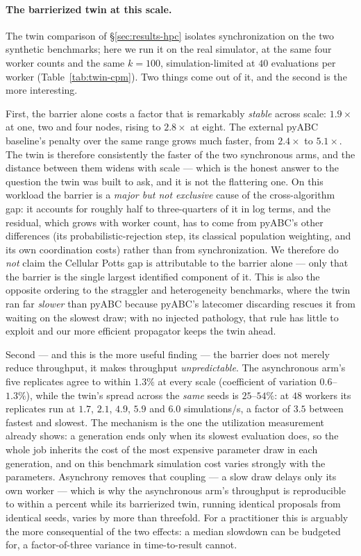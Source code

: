 \paragraph{The barrierized twin at this scale.} The twin comparison of \S\ref{sec:results-hpc} isolates synchronization on the two synthetic benchmarks; here we run it on the real simulator, at the same four worker counts and the same $k{=}100$, simulation-limited at $40$ evaluations per worker (Table~\ref{tab:twin-cpm}). Two things come out of it, and the second is the more interesting.

First, the barrier alone costs a factor that is remarkably \emph{stable} across scale: $1.9\times$ at one, two and four nodes, rising to $2.8\times$ at eight. The external pyABC baseline's penalty over the same range grows much faster, from $2.4\times$ to $5.1\times$. The twin is therefore consistently the faster of the two synchronous arms, and the distance between them widens with scale --- which is the honest answer to the question the twin was built to ask, and it is not the flattering one. On this workload the barrier is a \emph{major but not exclusive} cause of the cross-algorithm gap: it accounts for roughly half to three-quarters of it in log terms, and the residual, which grows with worker count, has to come from pyABC's other differences (its probabilistic-rejection step, its classical population weighting, and its own coordination costs) rather than from synchronization. We therefore do \emph{not} claim the Cellular Potts gap is attributable to the barrier alone --- only that the barrier is the single largest identified component of it. This is also the opposite ordering to the straggler and heterogeneity benchmarks, where the twin ran far \emph{slower} than pyABC because pyABC's latecomer discarding rescues it from waiting on the slowest draw; with no injected pathology, that rule has little to exploit and our more efficient propagator keeps the twin ahead.

Second --- and this is the more useful finding --- the barrier does not merely reduce throughput, it makes throughput \emph{unpredictable}. The asynchronous arm's five replicates agree to within $1.3\%$ at every scale (coefficient of variation $0.6$--$1.3\%$), while the twin's spread across the \emph{same} seeds is $25$--$54\%$: at $48$ workers its replicates run at $1.7$, $2.1$, $4.9$, $5.9$ and $6.0$ simulations/s, a factor of $3.5$ between fastest and slowest. The mechanism is the one the utilization measurement already shows: a generation ends only when its slowest evaluation does, so the whole job inherits the cost of the most expensive parameter draw in each generation, and on this benchmark simulation cost varies strongly with the parameters. Asynchrony removes that coupling --- a slow draw delays only its own worker --- which is why the asynchronous arm's throughput is reproducible to within a percent while its barrierized twin, running identical proposals from identical seeds, varies by more than threefold. For a practitioner this is arguably the more consequential of the two effects: a median slowdown can be budgeted for, a factor-of-three variance in time-to-result cannot.

